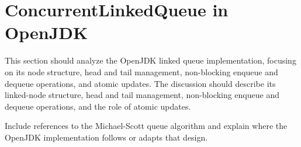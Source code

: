 \section{ConcurrentLinkedQueue in OpenJDK}
This section should analyze the OpenJDK linked queue implementation, focusing on its node structure, head and tail management, non-blocking enqueue and dequeue operations, and atomic updates. The discussion should describe its linked-node structure, head and tail management, non-blocking enqueue and dequeue operations, and the role of atomic updates.

Include references to the Michael-Scott queue algorithm and explain where the OpenJDK implementation follows or adapts that design.
